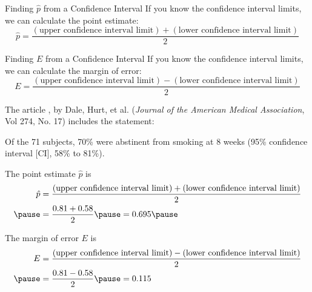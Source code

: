 \documentclass{beamer}
\begin{document}
\begin{frame}
\begin{block}{Finding $\hat{p}$ from a Confidence Interval}
If you know the confidence interval limits, we can calculate the point estimate:
\begin{equation*}
\hat{p} = \dfrac{(\text{upper confidence interval limit})+(\text{lower confidence interval limit})}{2}
\end{equation*}
\end{block}\pause

\begin{block}{Finding $E$ from a Confidence Interval}
If you know the confidence interval limits, we can calculate the margin of error:
\begin{equation*}
E = \dfrac{(\text{upper confidence interval limit})-(\text{lower confidence interval limit})}{2}
\end{equation*}
\end{block}
\end{frame}

\begin{frame}
\begin{example}
The article , by Dale, Hurt, et al. (\emph{Journal of the American Medical Association}, Vol 274, No. 17) includes the statement:
\vspace{-1mm}
\begin{center}
Of the 71 subjects, 70\% were abstinent from smoking at 8 weeks (95\% confidence interval [CI], 58\% to 81\%).
\end{center}\pause

\vspace{-2mm}
The point estimate $\hat{p}$ is
\begin{equation*}
\begin{aligned}
\hat{p} &= \dfrac{(\text{upper confidence interval limit})+(\text{lower confidence interval limit})}{2} \\\pause
&= \dfrac{0.81+0.58}{2}\pause
= 0.695\pause
\end{aligned}
\end{equation*}

The margin of error $E$ is
\begin{equation*}
\begin{aligned}
E &= \dfrac{(\text{upper confidence interval limit})-(\text{lower confidence interval limit})}{2} \\\pause
&= \dfrac{0.81-0.58}{2}\pause
= 0.115
\end{aligned}
\end{equation*}
\end{example}
\end{frame}
\end{document}
